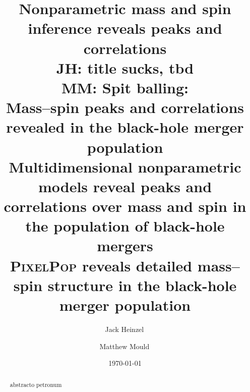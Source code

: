 \documentclass[%
 reprint,
 amsmath,amssymb,
 aps,
 prl,
 nofootinbib,nobibnotes,
]{revtex4-2}
\newcommand{\Msun}{\ensuremath{\mathrm{M}_{\odot}}}
\newcommand{\chieff}{\ensuremath{\chi_{\mathrm{eff}}}}
\newcommand{\red}[1]{{\color{Red} #1}}
\newcommand{\jh}[1]{{\color{orange}JH: #1}}
\newcommand{\mm}[1]{{\color{ForestGreen}MM: #1}}
\begin{document}
\title{
Nonparametric mass and spin inference reveals peaks and correlations
\\\jh{title sucks, tbd}
\\\mm{Spit balling:
\\Mass--spin peaks and correlations revealed in the black-hole merger population
\\Multidimensional nonparametric models reveal peaks and correlations over mass and spin in the population of black-hole mergers
\\\textsc{PixelPop} reveals detailed mass--spin structure in the black-hole merger population
}
}

\author{Jack Heinzel\,}

\author{Matthew Mould\,\orcidlink{}}


\date{\today}

\begin{abstract}
abstracto petronum

\end{abstract}

\maketitle

\end{document}
